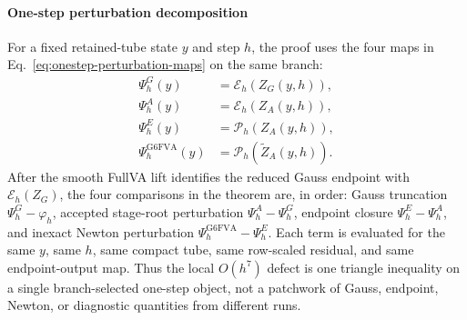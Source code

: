 \documentclass[preprint,12pt]{elsarticle}
\begin{document}
\paragraph{One-step perturbation decomposition}
For a fixed retained-tube state \(y\) and step \(h\), the proof uses the
four maps in Eq.~\eqref{eq:onestep-perturbation-maps} on the same branch:
\begin{equation}
\label{eq:onestep-perturbation-maps}
\begin{aligned}
  \Psi_h^G(y)&=\mathcal E_h(Z_G(y,h)),\\
  \Psi_h^A(y)&=\mathcal E_h(Z_A(y,h)),\\
  \Psi_h^E(y)&=\mathcal P_h(Z_A(y,h)),\\
  \Psi_h^{\mathrm{G6FVA}}(y)&=\mathcal P_h(\widetilde Z_A(y,h)).
\end{aligned}
\end{equation}
After the smooth FullVA lift identifies the reduced Gauss endpoint with
\(\mathcal E_h(Z_G)\), the four comparisons in the theorem are, in order:
Gauss truncation \(\Psi_h^G-\varphi_h\), accepted stage-root perturbation
\(\Psi_h^A-\Psi_h^G\), endpoint closure \(\Psi_h^E-\Psi_h^A\), and inexact
Newton perturbation \(\Psi_h^{\mathrm{G6FVA}}-\Psi_h^E\).  Each term is
evaluated for the same \(y\), same \(h\), same compact tube, same row-scaled
residual, and same endpoint-output map.  Thus the local \(O(h^7)\) defect is
one triangle inequality on a single branch-selected one-step object, not a
patchwork of Gauss, endpoint, Newton, or diagnostic quantities from different
runs.
\end{document}
